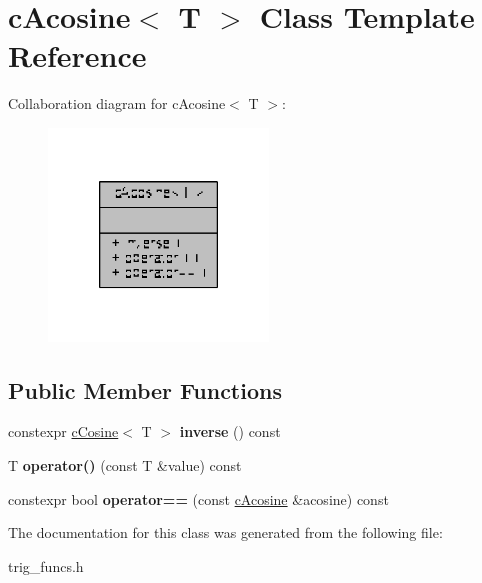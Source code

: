 \hypertarget{classcAcosine}{\section{c\-Acosine$<$ T $>$ Class Template Reference}
\label{classcAcosine}
}


Collaboration diagram for c\-Acosine$<$ T $>$\-:
\nopagebreak
\begin{figure}[H]
\begin{center}
\leavevmode
\includegraphics[width=166pt]{classcAcosine__coll__graph}
\end{center}
\end{figure}
\subsection*{Public Member Functions}
\begin{DoxyCompactItemize}
\item 
\hypertarget{classcAcosine_ab1a93d5d6fade4bfa368e2d676b9d61a}{constexpr \hyperlink{classcCosine}{c\-Cosine}$<$ T $>$ {\bfseries inverse} () const }\label{classcAcosine_ab1a93d5d6fade4bfa368e2d676b9d61a}

\item 
\hypertarget{classcAcosine_a5852b1edee1ceb04ed1a85ba24c2ac1a}{T {\bfseries operator()} (const T \&value) const }\label{classcAcosine_a5852b1edee1ceb04ed1a85ba24c2ac1a}

\item 
\hypertarget{classcAcosine_a52da8a656c380e1220a11c621989d255}{constexpr bool {\bfseries operator==} (const \hyperlink{classcAcosine}{c\-Acosine} \&acosine) const }\label{classcAcosine_a52da8a656c380e1220a11c621989d255}

\end{DoxyCompactItemize}


The documentation for this class was generated from the following file\-:\begin{DoxyCompactItemize}
\item 
trig\-\_\-funcs.\-h\end{DoxyCompactItemize}
